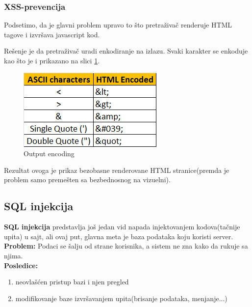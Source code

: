 \documentclass[a4paper]{article}
\begin{document}
\subsubsection{XSS-prevencija}
Podsetimo, da je glavni problem upravo to \v{s}to pretra\v{z}iva\v{c} renderuje HTML tagove i izvr\v{s}ava javascript kod.  

Re\v{s}enje je da pretra\v{z}iva\v{c} uradi enkodiranje na izlazu. Svaki karakter se enkoduje kao \v{s}to je i prikazano na slici \ref{kodiranje}.

\begin{figure}[ht]
\begin{center}
\includegraphics[scale=0.75]{htmlKodiranje.png}
\caption{Output encoding}
\end{center}
\label{kodiranje}
\end{figure}

Rezultat ovoga je prikaz bezobasne renderovane HTML stranice(premda je problem samo preme\v{s}ten sa bezbednosnog na vizuelni).
\subsection{SQL injekcija}
\textbf{SQL injekcija} predstavlja jo\v{s} jedan vid napada injektovanjem kodova(ta\v{c}nije upita) u sajt, ali ovaj put, glavna meta je baza podataka koju koristi server.\\
\textbf{Problem:} Podaci se \v{s}alju od strane korisnika, a sistem ne zna kako da rukuje sa njima.\\
\textbf{Posledice:} 
\begin{enumerate}
	\item neovla\v{s}\'{c}en pristup bazi i njen pregled
	\item modifikovanje baze izvr\v{s}avanjem upita(brisanje podataka, menjanje...)
\end{enumerate}
\end{document}
